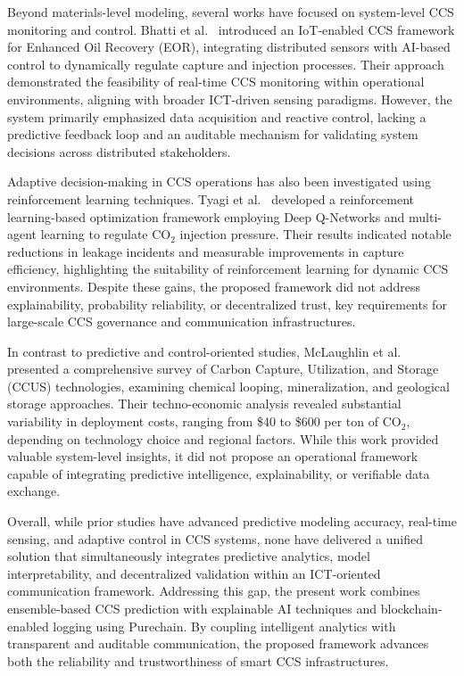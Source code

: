 \documentclass[conference]{IEEEtran}
\begin{document}
Beyond materials-level modeling, several works have focused on system-level CCS monitoring and control. Bhatti et al.~\cite{bhatti2024aiot} introduced an IoT-enabled CCS framework for Enhanced Oil Recovery (EOR), integrating distributed sensors with AI-based control to dynamically regulate capture and injection processes. Their approach demonstrated the feasibility of real-time CCS monitoring within operational environments, aligning with broader ICT-driven sensing paradigms. However, the system primarily emphasized data acquisition and reactive control, lacking a predictive feedback loop and an auditable mechanism for validating system decisions across distributed stakeholders.

Adaptive decision-making in CCS operations has also been investigated using reinforcement learning techniques. Tyagi et al.~\cite{tyagi2025applying} developed a reinforcement learning-based optimization framework employing Deep Q-Networks and multi-agent learning to regulate CO$_2$ injection pressure. Their results indicated notable reductions in leakage incidents and measurable improvements in capture efficiency, highlighting the suitability of reinforcement learning for dynamic CCS environments. Despite these gains, the proposed framework did not address explainability, probability reliability, or decentralized trust, key requirements for large-scale CCS governance and communication infrastructures.

In contrast to predictive and control-oriented studies, McLaughlin et al.~\cite{mclaughlin2023carbon} presented a comprehensive survey of Carbon Capture, Utilization, and Storage (CCUS) technologies, examining chemical looping, mineralization, and geological storage approaches. Their techno-economic analysis revealed substantial variability in deployment costs, ranging from \$40 to \$600 per ton of CO$_2$, depending on technology choice and regional factors. While this work provided valuable system-level insights, it did not propose an operational framework capable of integrating predictive intelligence, explainability, or verifiable data exchange.

Overall, while prior studies have advanced predictive modeling accuracy, real-time sensing, and adaptive control in CCS systems, none have delivered a unified solution that simultaneously integrates predictive analytics, model interpretability, and decentralized validation within an ICT-oriented communication framework. Addressing this gap, the present work combines ensemble-based CCS prediction with explainable AI techniques and blockchain-enabled logging using Purechain. By coupling intelligent analytics with transparent and auditable communication, the proposed framework advances both the reliability and trustworthiness of smart CCS infrastructures.
\end{document}
